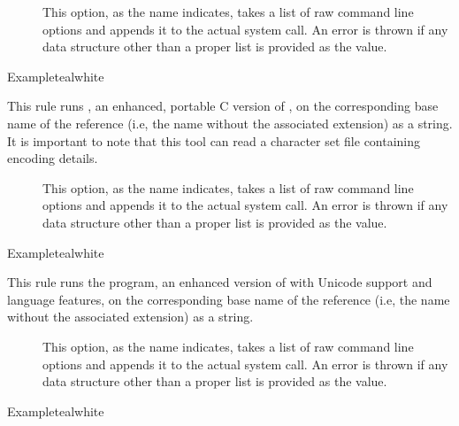 \begin{description}
\begin{description}
\item[] This option, as the name indicates, takes a list of raw command line options and appends it to the actual system call. An error is thrown if any data structure other than a proper list is provided as the value.
\end{description}

\begin{codebox}{Example}{teal}{\icnote}{white}
\end{codebox}

\item[\rulebox{bibtex8}]
This rule runs , an enhanced, portable C version of , on the corresponding base name of the  reference (i.e, the name without the associated extension) as a string. It is important to note that this tool can read a character set file containing encoding details.

\begin{description}
\item[] This option, as the name indicates, takes a list of raw command line options and appends it to the actual system call. An error is thrown if any data structure other than a proper list is provided as the value.
\end{description}

\begin{codebox}{Example}{teal}{\icnote}{white}
\end{codebox}

\item[\rulebox{bibtexu}]
This rule runs the  program, an enhanced version of  with Unicode support and language features, on the corresponding base name of the  reference (i.e, the name without the associated extension) as a string.

\begin{description}
\item[] This option, as the name indicates, takes a list of raw command line options and appends it to the actual system call. An error is thrown if any data structure other than a proper list is provided as the value.
\end{description}

\begin{codebox}{Example}{teal}{\icnote}{white}
\end{codebox}


\end{description}
